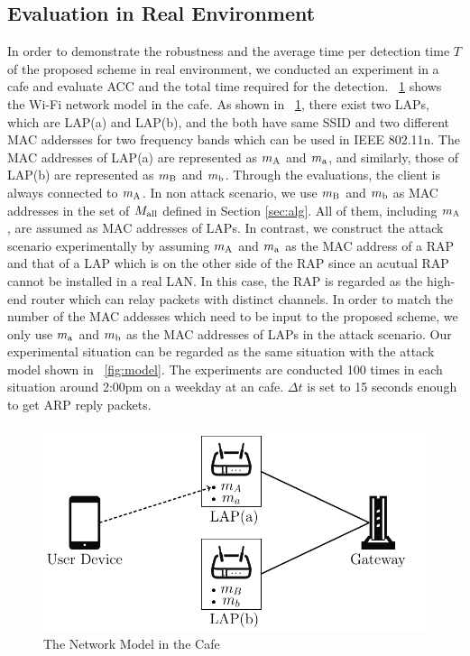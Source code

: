 \documentclass[conference]{IEEEtran}
\newcommand{\stba}{m_{\rm a}}
\newcommand{\stbA}{m_{\rm A}}
\newcommand{\stbb}{m_{\rm b}}
\newcommand{\stbB}{m_{\rm B}}
\begin{document}
\subsection{Evaluation in Real Environment}
In order to demonstrate the robustness and the average time per detection time $T$ of the proposed scheme in real environment, we conducted an experiment in a cafe and evaluate ACC and the total time required for the detection.
\figurename~\ref{fig:sbx} shows the Wi-Fi network model in the cafe.
As shown in \figurename~\ref{fig:sbx}, there exist two LAPs, which are LAP(a) and LAP(b), and the both have same SSID and two different MAC addersses for two frequency bands which can be used in IEEE 802.11n.
The MAC addresses of LAP(a) are represented as $\stbA$ and $\stba$, and similarly, those of LAP(b) are represented as $\stbB$ and $\stbb$.
Through the evaluations, the client is always connected to $\stbA$.
In non attack scenario, we use $\stbB$ and $\stbb$ as MAC addresses in the set of $M_{\rm all}$ defined in Section \ref{sec:alg}.
All of them, including $\stbA$, are assumed as MAC addresses of LAPs.
In contrast, we construct the attack scenario experimentally by assuming $\stbA$ and $\stba$ as the MAC address of a RAP and that of a LAP which is on the other side of the RAP since an acutual RAP cannot be installed in a real LAN.
In this case, the RAP is regarded as the high-end router which can relay packets with distinct channels.
In order to match the number of the MAC addesses which need to be input to the proposed scheme, we only use $\stba$ and $\stbb$ as the MAC addresses of LAPs in the attack scenario.
Our experimental situation can be regarded as the same situation with the attack model shown in \figurename~\ref{fig:model}.
The experiments are conducted 100 times in each situation around 2:00pm on a weekday at an cafe.
$\Delta t$ is set to 15 seconds enough to get ARP reply packets.
\begin{figure}[t]
    \begin{center}
        \includegraphics[scale=0.5]{starbucks/starbucks.pdf}
        \caption{The Network Model in the Cafe}
        \label{fig:sbx}
    \end{center}
    \vspace{-1zh}
\end{figure}
\end{document}
